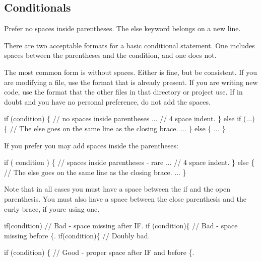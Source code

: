 \subsection*{Conditionals}

Prefer no spaces inside parentheses. The else keyword belongs on a new line.

There are two acceptable formats for a basic conditional statement. One includes spaces between the parentheses and the condition, and one does not.

The most common form is without spaces. Either is fine, but be consistent. If you are modifying a file, use the format that is already present. If you are writing new code, use the format that the other files in that directory or project use. If in doubt and you have no personal preference, do not add the spaces.


\begin{DoxyCode}
\textcolor{keywordflow}{if} (condition) \{  \textcolor{comment}{// no spaces inside parentheses}
    ...  \textcolor{comment}{// 4 space indent.}
\} \textcolor{keywordflow}{else} \textcolor{keywordflow}{if} (...) \{  \textcolor{comment}{// The else goes on the same line as the closing brace.}
    ...
\} \textcolor{keywordflow}{else} \{
    ...
\}
\end{DoxyCode}


If you prefer you may add spaces inside the parentheses\+:


\begin{DoxyCode}
\textcolor{keywordflow}{if} ( condition ) \{  \textcolor{comment}{// spaces inside parentheses - rare}
    ...  \textcolor{comment}{// 4 space indent.}
\} \textcolor{keywordflow}{else} \{  \textcolor{comment}{// The else goes on the same line as the closing brace.}
    ...
\}
\end{DoxyCode}


Note that in all cases you must have a space between the {\ttfamily if} and the open parenthesis. You must also have a space between the close parenthesis and the curly brace, if you\textquotesingle{}re using one.


\begin{DoxyCode}
\textcolor{keywordflow}{if}(condition)     \textcolor{comment}{// Bad - space missing after IF.}
\textcolor{keywordflow}{if} (condition)\{   \textcolor{comment}{// Bad - space missing before \{.}
\textcolor{keywordflow}{if}(condition)\{    \textcolor{comment}{// Doubly bad.}

\textcolor{keywordflow}{if} (condition) \{  \textcolor{comment}{// Good - proper space after IF and before \{.}
\end{DoxyCode}


